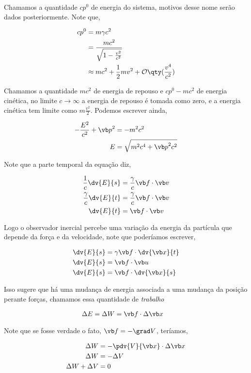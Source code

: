 \documentclass[twoside]{amsart}
\numberwithin{equation}{section}
\begin{document}
\begin{refsection}
Chamamos a quantidade $cp^0$ de energia do sistema, motivos desse nome serão dados posteriormente. Note que,

\begin{align}
    cp^0&=m\gamma c^2\\
    &=\frac{mc^2}{\sqrt{1-\frac{v^2}{c^2}}}\\
    &\approx mc^2+\frac12 mv^2+\mathcal O\qty(\frac{v^4}{c^2})
\end{align}

Chamamos a quantidade $mc^2$ de energia de repouso e $cp^0-mc^2$ de energia cinética, no limite $c\rightarrow \infty$ a energia de repouso é tomada como zero, e a energia cinética tem limite como $m\frac{v^2}{2}$. Podemos escrever ainda,

\begin{align}
    -\frac{E^2}{c^2}+{\vb p}^2&=-m^2c^2\\
    E&=\sqrt{m^2c^4+{\vb p}^2c^2}
\end{align}

Note que a parte temporal da equação diz,

\begin{align}
    \frac1c\dv{E}{s}&=\frac\gamma c\vb f\cdot \vb v\\
    \frac\gamma c\dv{E}{t}&=\frac\gamma c\vb f\cdot \vb v\\
    \dv{E}{t}&=\vb f\cdot \vb v
\end{align}

Logo o observador inercial percebe uma variação da energia da partícula que depende da força e da velocidade, note que poderíamos escrever,

\begin{align}
    \dv{E}{s}&=\gamma\vb f \cdot \dv{\vb x}{t}\\
    \dv{E}{s}&=\vb f\cdot \vb u\\
    \dv{E}{s}&=\vb f\cdot \dv{\vb x}{s}
\end{align}

Isso sugere que há uma mudança de energia associada a uma mudança da posição perante forças, chamamos essa quantidade de \emph{trabalho}

\begin{align}
    \Delta E&=\Delta W=\vb f\cdot \Delta \vb x
\end{align}

Note que se fosse verdade o fato, $\vb f =-\grad V$, teríamos,

\begin{align}
    \Delta W&=-\pdv{V}{\vb x}\cdot \Delta \vb x\\
    \Delta W&=-\Delta V\\
    \Delta W+\Delta V&=0
\end{align}


\end{refsection}
\end{document}
